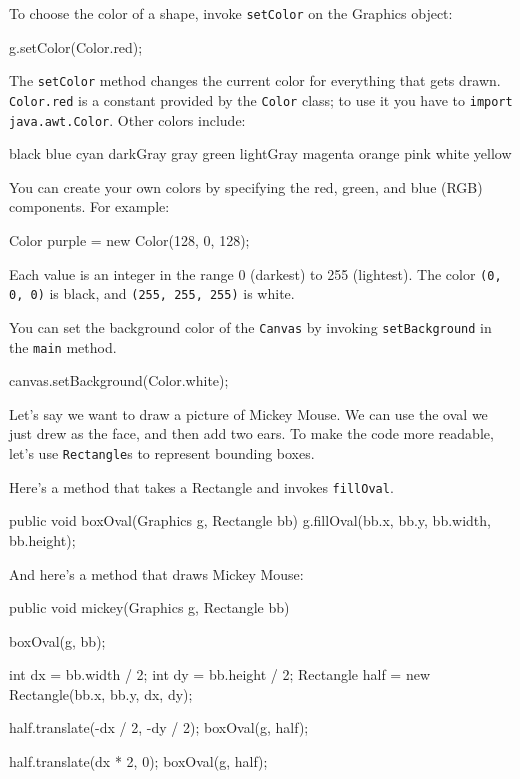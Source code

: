 \documentclass[12pt]{book}
\theoremstyle{exercise}
\newcommand{\java}[1]{\verb"#1"}
\newcommand{\java}[1]{\lstinline{#1}} %
\begin{document}

To choose the color of a shape, invoke \java{setColor} on the Graphics object:

\begin{code}
    g.setColor(Color.red);
\end{code}

The \java{setColor} method changes the current color for everything that gets drawn.
\java{Color.red} is a constant provided by the {\tt Color} class; to use it you have to \java{import java.awt.Color}.
Other colors include:

\begin{stdout}
    black       blue      cyan     darkGray   gray    green
    lightGray   magenta   orange   pink       white   yellow
\end{stdout}

You can create your own colors by specifying the red, green, and blue (RGB) components.
For example:

\begin{code}
    Color purple = new Color(128, 0, 128);
\end{code}

Each value is an integer in the range 0 (darkest) to 255 (lightest).
The color \java{(0, 0, 0)} is black, and \java{(255, 255, 255)} is white.

You can set the background color of the \java{Canvas} by invoking \java{setBackground} in the \java{main} method.

\begin{code}
    canvas.setBackground(Color.white);
\end{code}


Let's say we want to draw a picture of Mickey Mouse.
We can use the oval we just drew as the face, and then add two ears.
To make the code more readable, let's use \java{Rectangle}s to represent bounding boxes.

Here's a method that takes a Rectangle and invokes \java{fillOval}.

\begin{code}
    public void boxOval(Graphics g, Rectangle bb) {
        g.fillOval(bb.x, bb.y, bb.width, bb.height);
    }
\end{code}

And here's a method that draws Mickey Mouse:

\begin{code}
    public void mickey(Graphics g, Rectangle bb) {
        boxOval(g, bb);

        int dx = bb.width / 2;
        int dy = bb.height / 2;
        Rectangle half = new Rectangle(bb.x, bb.y, dx, dy);

        half.translate(-dx / 2, -dy / 2);
        boxOval(g, half);

        half.translate(dx * 2, 0);
        boxOval(g, half);
    }
\end{code}
\end{document}
